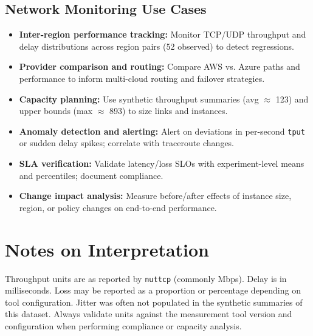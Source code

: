 \documentclass[11pt,a4paper]{article}
\begin{document}
\subsection*{Network Monitoring Use Cases}
\begin{itemize}[leftmargin=1.2em]
  \item \textbf{Inter-region performance tracking:} Monitor TCP/UDP throughput and delay distributions across region pairs (52 observed) to detect regressions.
  \item \textbf{Provider comparison and routing:} Compare AWS vs. Azure paths and performance to inform multi-cloud routing and failover strategies.
  \item \textbf{Capacity planning:} Use synthetic throughput summaries (avg $\approx$ 123) and upper bounds (max $\approx$ 893) to size links and instances.
  \item \textbf{Anomaly detection and alerting:} Alert on deviations in per-second \texttt{tput} or sudden delay spikes; correlate with traceroute changes.
  \item \textbf{SLA verification:} Validate latency/loss SLOs with experiment-level means and percentiles; document compliance.
  \item \textbf{Change impact analysis:} Measure before/after effects of instance size, region, or policy changes on end-to-end performance.
\end{itemize}

\section*{Notes on Interpretation}
Throughput units are as reported by \texttt{nuttcp} (commonly Mbps). Delay is in milliseconds. Loss may be reported as a proportion or percentage depending on tool configuration. Jitter was often not populated in the synthetic summaries of this dataset. Always validate units against the measurement tool version and configuration when performing compliance or capacity analysis.
\end{document}
